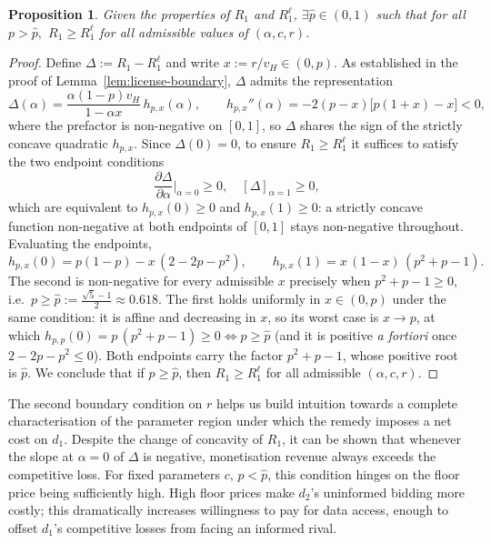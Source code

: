 \documentclass[11pt]{article}
\theoremstyle{plain}
\theoremstyle{definition}
\theoremstyle{plain}
\theoremstyle{plain}
\theoremstyle{plain}
\theoremstyle{plain}
\newtheorem{prop}[thm]{Proposition}
\numberwithin{equation}{section}
\begin{document}
\begin{prop}\label{always-license}
    Given the properties of $R_1$ and $R_1^\ell$, $\exists \hat{p} \in (0,1)$ such that for all $p > \hat{p},$ $R_1 \geq R_1^\ell$ for all admissible values of $(\alpha, c,r)$.
\end{prop}
\begin{proof}
    Define $\Delta := R_1 - R_1^\ell$ and write $x := r/v_H \in (0,p)$. As established in the proof of Lemma~\ref{lem:license-boundary}, $\Delta$ admits the representation
\begin{equation*}
    \Delta(\alpha) = \frac{\alpha (1-p) v_H}{1-\alpha x}\, h_{p,x}(\alpha), \qquad h_{p,x}''(\alpha) = -2(p-x)\big[p(1+x)-x\big] < 0,
\end{equation*}
where the prefactor is non-negative on $[0,1]$, so $\Delta$ shares the sign of the strictly concave quadratic $h_{p,x}$. Since $\Delta(0)=0$, to ensure $R_1 \geq R_1^\ell$ it suffices to satisfy the two endpoint conditions
\begin{equation*}
    \frac{\partial \Delta}{\partial \alpha} \bigg|_{\alpha = 0}\geq0, \quad \left[\Delta\right]_{\alpha = 1} \geq 0,
\end{equation*}
which are equivalent to $h_{p,x}(0)\geq 0$ and $h_{p,x}(1)\geq 0$: a strictly concave function non-negative at both endpoints of $[0,1]$ stays non-negative throughout. Evaluating the endpoints,
\begin{equation*}
    h_{p,x}(0) = p(1-p) - x\,(2-2p-p^2), \qquad h_{p,x}(1) = x\,(1-x)\,(p^2+p-1).
\end{equation*}
The second is non-negative for every admissible $x$ precisely when $p^2+p-1 \geq 0$, i.e.\ $p \geq \hat{p} := \frac{\sqrt{5}-1}{2} \approx 0.618$. The first holds uniformly in $x\in(0,p)$ under the same condition: it is affine and decreasing in $x$, so its worst case is $x \to p$, at which $h_{p,p}(0) = p\,(p^2+p-1) \geq 0 \iff p \geq \hat{p}$ (and it is positive \emph{a fortiori} once $2-2p-p^2\leq 0$). Both endpoints carry the factor $p^2+p-1$, whose positive root is $\hat{p}$. We conclude that if $p \geq \hat{p}$, then $R_1 \geq R_1^\ell$ for all admissible $(\alpha, c, r)$.
\end{proof}
\vspace{2mm}

\noindent The second boundary condition on $r$ helps us build intuition towards a complete characterisation of the parameter region under which the remedy imposes a net cost on $d_1$. Despite the change of concavity of $R_1$, it can be shown that whenever the slope at $\alpha=0$ of $\Delta$ is negative, monetisation revenue always exceeds the competitive loss. For fixed parameters $c, \, p < \hat{p}$, this condition hinges on the floor price being sufficiently high. High floor prices make $d_2$'s uninformed bidding more costly; this dramatically increases willingness to pay for data access, enough to offset $d_1$'s competitive losses from facing an informed rival.
\end{document}
